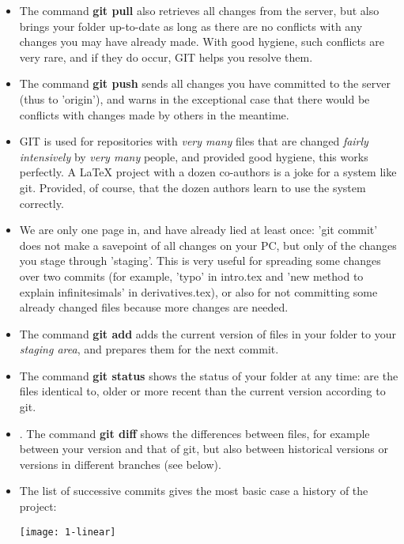 \documentclass{ximera}
\begin{document}
\begin{itemize}
\item The command \textbf{git pull} also retrieves all changes from the server, but also brings your folder up-to-date as long as there are no conflicts with any changes you may have already made. With good hygiene, such conflicts are very rare, and if they do occur, GIT helps you resolve them.

\item The command \textbf{git push} sends all changes you have committed to the server (thus to 'origin'), and warns in the exceptional case that there would be conflicts with changes made by others in the meantime.

\item GIT is used for repositories with \textit{very many} files that are changed \textit{fairly intensively} by \textit{very many} people, and provided good hygiene, this works perfectly. A LaTeX project with a dozen co-authors is a joke for a system like git. Provided, of course, that the dozen authors learn to use the system correctly.

\item We are only one page in, and have already lied at least once: 'git commit' does not make a savepoint of all changes on your PC, but only of the changes you stage through 'staging'. This is very useful for spreading some changes over two commits (for example, 'typo' in intro.tex and 'new method to explain infinitesimals' in derivatives.tex), or also for not committing some already changed files because more changes are needed.

\item The command \textbf{git add} adds the current version of files in your folder to your \textit{staging area}, and prepares them for the next commit.

\item The command \textbf{git status} shows the status of your folder at any time: are the files identical to, older or more recent than the current version according to git.

\item. The command \textbf{git diff} shows the differences between files, for example between your version and that of git, but also between historical versions or versions in different branches (see below).

\item The list of successive commits gives the most basic case a history of the project:
\begin{image}[1cm]
\texttt{[image: 1-linear]}
\end{image}



\end{itemize}
\end{document}
